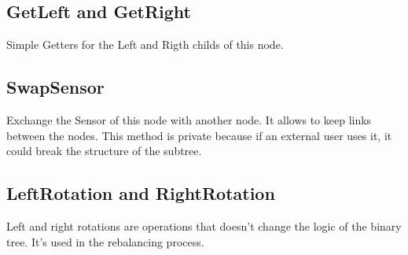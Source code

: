 \documentclass[10pt]{article}
\begin{document}
\subsection{GetLeft and GetRight}
Simple Getters for the Left and Rigth childs of this node.
\subsection{SwapSensor}
Exchange the Sensor of this node with another node. It allows to keep links between the nodes. This method is private because if an external user uses it, it could break the structure of the subtree.
\subsection{LeftRotation and RightRotation}
Left and right rotations are operations that doesn't change the logic of the binary tree. It's used in the rebalancing process.
\end{document}
